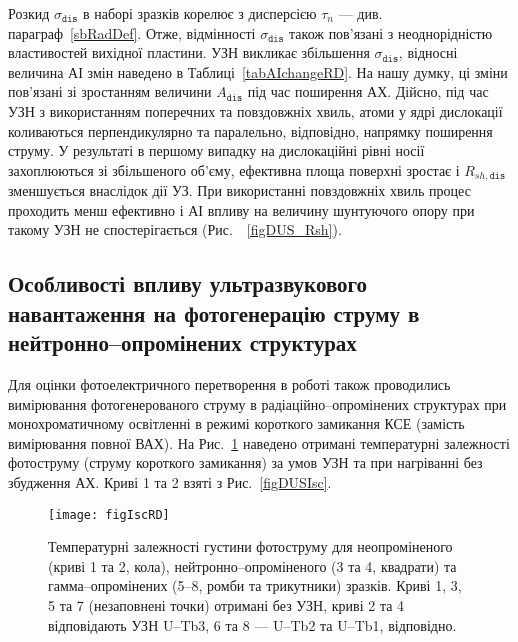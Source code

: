 Розкид $\sigma_{\mathtt{dis}}$ в наборі зразків корелює з дисперсією $\tau_n$ --- див. параграф~\ref{sbRadDef}.
Отже, відмінності $\sigma_{\mathtt{dis}}$ також пов'язані з неоднорідністю
властивостей вихідної пластини.
УЗН викликає збільшення $\sigma_{\mathtt{dis}}$, відносні величина АІ змін
наведено в Таблиці~\ref{tabAIchangeRD}.
На нашу думку, ці зміни пов'язані зі зростанням величини $A_\mathtt{dis}$ під час поширення АХ.
Дійсно, під час УЗН з використанням поперечних та повздовжніх хвиль,
атоми у ядрі дислокації коливаються перпендикулярно та паралельно, відповідно, напрямку поширення струму.
У результаті в першому випадку на дислокаційні рівні носії захоплюються зі збільшеного об'єму,
ефективна площа поверхні зростає і $R_{sh,\mathtt{dis}}$ зменшується внаслідок дії УЗ.
При використанні повздовжніх хвиль процес проходить менш ефективно і АІ впливу на величину
шунтуючого опору при такому УЗН не спостерігається (Рис.~~\ref{figDUS_Rsh}).

\subsection{Особливості впливу ультразвукового навантаження на фотогенерацію струму в нейтронно--опромінених структурах\label{sbNIsc}}

Для оцінки фотоелектричного перетворення в роботі також проводились вимірювання фотогенерованого струму
в радіаційно--опромінених структурах
при монохроматичному освітленні в режимі короткого замикання КСЕ (замість вимірювання повної ВАХ).
На Рис.~\ref{figIscRD} наведено отримані температурні залежності фотоструму (струму короткого замикання)
за умов УЗН та при нагріванні без збудження АХ.
Криві 1 та 2 взяті з Рис.~\ref{figDUSIsc}.




\begin{figure}[b]
\center
\texttt{[image: figIscRD]}
\caption{\label{figIscRD}
Температурні залежності густини фотоструму
для неопроміненого (криві 1 та 2, кола),
нейтронно--опроміненого (3 та 4, квадрати) та
гамма--опромінених (5--8, ромби та трикутники)
зразків.
Криві 1, 3, 5 та 7 (незаповнені точки) отримані без УЗН,
криві 2 та 4 відповідають УЗН U--Tb3,
6 та 8 ---
U--Tb2 та U--Tb1, відповідно.
}%
\end{figure}

